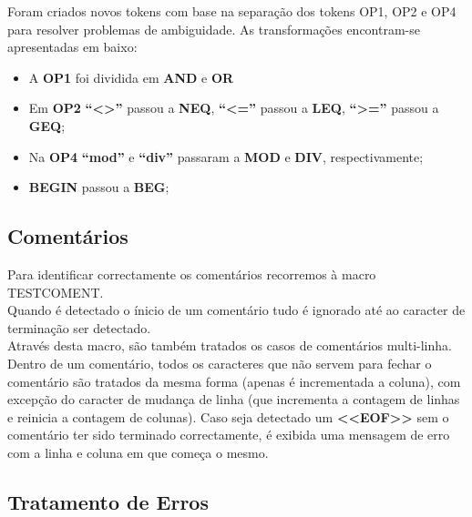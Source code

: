 \documentclass[12pt]{article}
\begin{document}
\indent Foram criados novos tokens com base na separação dos tokens OP1, OP2 e OP4 para resolver problemas de ambiguidade. As transformações encontram-se apresentadas em baixo:

\begin{itemize}

\item A \textbf{OP1} foi dividida em \textbf{AND} e \textbf{OR}

\item Em \textbf{OP2} \textbf{``<>''} passou a \textbf{NEQ}, \textbf{``<=''} passou a \textbf{LEQ}, \textbf{``>=''} passou a \textbf{GEQ};

\item Na \textbf{OP4} \textbf{``mod''} e \textbf{``div''} passaram a \textbf{MOD} e \textbf{DIV}, respectivamente;

\item \textbf{BEGIN} passou a \textbf{BEG};

\end{itemize}


\newpage


\subsection{Comentários}

\indent Para identificar correctamente os comentários recorremos à macro TESTCOMENT.\\
\indent Quando é detectado o ínicio de um comentário tudo é ignorado até ao caracter de terminação ser detectado.\\
\indent Através desta macro, são também tratados os casos de comentários multi-linha.\\
\indent Dentro de um comentário, todos os caracteres que não servem para fechar o comentário são tratados da mesma forma (apenas é incrementada a coluna), com excepção do caracter de mudança de linha (que incrementa a contagem de linhas e reinicia a contagem de colunas).
\indent Caso seja detectado um \textbf{<<EOF>>} sem o comentário ter sido terminado correctamente, é exibida uma mensagem de erro com a linha e coluna em que começa o mesmo.

\subsection{Tratamento de Erros}
\end{document}
